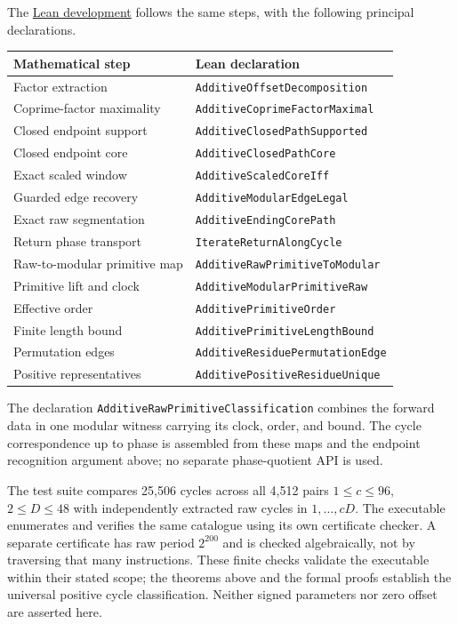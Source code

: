 \documentclass[11pt,letterpaper]{article}
\begin{document}
The \href{../lean/AdditiveCycles.lean}{Lean development} follows the same
steps, with the following principal declarations.
\begin{center}
\begin{tabular}{ll}
\toprule
Mathematical step & Lean declaration\\
\midrule
Factor extraction & \texttt{AdditiveOffsetDecomposition}\\
Coprime-factor maximality & \texttt{AdditiveCoprimeFactorMaximal}\\
Closed endpoint support & \texttt{AdditiveClosedPathSupported}\\
Closed endpoint core & \texttt{AdditiveClosedPathCore}\\
Exact scaled window & \texttt{AdditiveScaledCoreIff}\\
Guarded edge recovery & \texttt{AdditiveModularEdgeLegal}\\
Exact raw segmentation & \texttt{AdditiveEndingCorePath}\\
Return phase transport & \texttt{IterateReturnAlongCycle}\\
Raw-to-modular primitive map & \texttt{AdditiveRawPrimitiveToModular}\\
Primitive lift and clock & \texttt{AdditiveModularPrimitiveRaw}\\
Effective order & \texttt{AdditivePrimitiveOrder}\\
Finite length bound & \texttt{AdditivePrimitiveLengthBound}\\
Permutation edges & \texttt{AdditiveResiduePermutationEdge}\\
Positive representatives & \texttt{AdditivePositiveResidueUnique}\\
\bottomrule
\end{tabular}
\end{center}
The declaration \texttt{AdditiveRawPrimitiveClassification} combines the
forward data in one modular witness carrying its clock, order, and bound.
The cycle correspondence up to phase is assembled from these maps and the
endpoint recognition argument above; no separate phase-quotient API is used.

The test suite compares 25,506 cycles across all 4,512 pairs
$1\le c\le96$, $2\le D\le48$ with independently extracted raw cycles in
$1,\ldots,cD$. The executable enumerates and verifies the same catalogue
using its own certificate checker. A separate certificate has raw period
$2^{200}$ and is checked
algebraically, not by traversing that many instructions. These finite checks
validate the executable within their stated scope; the theorems above and
the formal proofs establish the universal positive cycle classification.
Neither signed parameters nor zero offset are asserted here.



\end{document}
